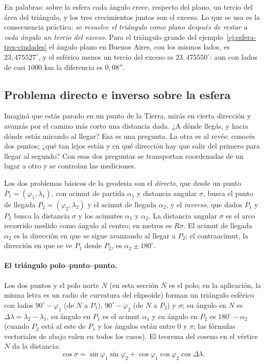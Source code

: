 En palabras: sobre la esfera cada ángulo crece, respecto del plano, un tercio del área del
triángulo, y los tres crecimientos juntos son el exceso. Lo que se usa es la
consecuencia práctica: \emph{se resuelve el
triángulo como plano después de restar a cada ángulo un tercio del exceso}. Para el
triángulo grande del ejemplo~\ref{ej:esfera-tres-ciudades} el ángulo plano en Buenos Aires,
con los mismos lados, es \(23{,}475527^\circ\), y el esférico menos un tercio del exceso es
\(23{,}475550^\circ\): aun con lados de casi \(1000\) km la diferencia es \(0{,}08''\).

\subsection{Problema directo e inverso sobre la esfera}\label{sec:problema-directo-inverso}

Imaginá que estás parado en un punto de la Tierra, mirás en cierta dirección y avanzás por el
camino más corto una distancia dada. ¿A dónde llegás, y hacia dónde estás mirando al llegar?
Esa es una pregunta. La otra es al revés: conocés dos puntos; ¿qué tan lejos están y en qué
dirección hay que salir del primero para llegar al segundo? Con esas dos preguntas se
transportan coordenadas de un lugar a otro y se controlan las mediciones.

Los dos problemas básicos de la geodesia son el \emph{directo}, que desde un punto
\(P_1=(\varphi_1,\lambda_1)\), con acimut de partida \(\alpha_1\) y distancia angular
\(\sigma\), busca el punto de llegada \(P_2=(\varphi_2,\lambda_2)\) y el acimut de llegada
\(\alpha_2\), y el \emph{inverso}, que dados \(P_1\) y \(P_2\) busca la distancia \(\sigma\) y
los acimutes \(\alpha_1\) y \(\alpha_2\). La distancia angular \(\sigma\) es el arco recorrido
medido como ángulo al centro; en metros es \(R\sigma\). El acimut de llegada \(\alpha_2\) es la dirección en que se sigue avanzando al llegar a
\(P_2\); el contraacimut, la dirección en que se ve \(P_1\) desde \(P_2\), es
\(\alpha_2\pm180^\circ\).

\paragraph{El triángulo polo--punto--punto.} Los dos puntos y el polo norte \(N\) (en esta
sección \(N\) es el polo; en la aplicación, la misma letra es un radio de curvatura del
elipsoide) forman un
triángulo esférico con lados \(90^\circ-\varphi_1\) (de \(N\) a \(P_1\)),
\(90^\circ-\varphi_2\) (de \(N\) a \(P_2\)) y \(\sigma\); su ángulo en \(N\) es
\(\Delta\lambda=\lambda_2-\lambda_1\), su ángulo en \(P_1\) es el acimut \(\alpha_1\) y su
ángulo en \(P_2\) es \(180^\circ-\alpha_2\) (cuando \(P_2\) está al este de \(P_1\) y los
ángulos están entre \(0\) y \(\pi\); las fórmulas vectoriales de abajo valen en todos los casos).
El teorema del coseno en el vértice \(N\) da la distancia:
\[
  \cos\sigma=\sin\varphi_1\sin\varphi_2+\cos\varphi_1\cos\varphi_2\cos\Delta\lambda .
\]

